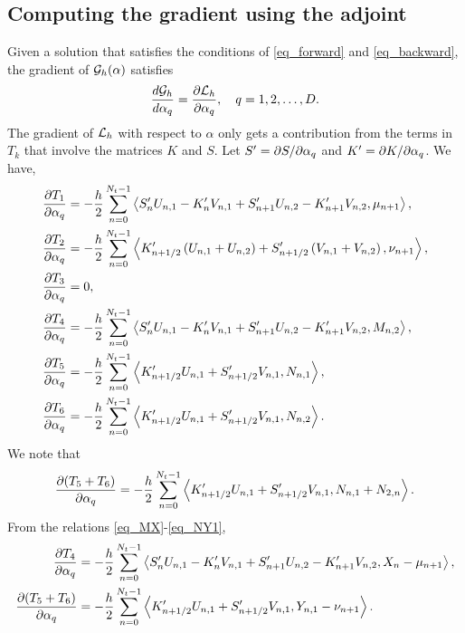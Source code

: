 \documentclass[11pt]{article}
\begin{document}
\subsection{Computing the gradient using the adjoint}

Given a solution that satisfies the conditions of \eqref{eq_forward} and \eqref{eq_backward}, the
gradient of ${\cal G}_h(\alpha)$ satisfies
\[
\frac{d{\cal G}_h}{d\alpha_q} = \frac{\partial{\cal L}_h}{\partial \alpha_q},\quad q=1,2,\ldots,D.
\]
The gradient of ${\cal L}_h$ with respect to $\alpha$ only gets a contribution from the terms in $T_k$ that involve the matrices $K$
and $S$. Let $S' = \partial S/\partial \alpha_q$ and $K' = \partial K/\partial \alpha_q$. We have,
\begin{align}
\frac{\partial T_1}{\partial \alpha_q} &=  - \frac{h}{2} \sum_{n=0}^{N_t-1} \left\langle S'_nU_{n,1} -
K'_nV_{n,1} + S'_{n+1}U_{n,2} - K'_{n+1}V_{n,2}, \mu_{n+1} \right\rangle,\\ 
\frac{\partial T_2}{\partial \alpha_q} &= - \frac{h}{2} \sum_{n=0}^{N_t-1} \left\langle K'_{n+1/2} \left(U_{n,1} + U_{n,2}\right) + S'_{n+1/2}\left(
  V_{n,1} +  V_{n,2}\right), \nu_{n+1} \right\rangle,\\
\frac{\partial T_3}{\partial \alpha_q} &= 0,\\
\frac{\partial T_4}{\partial \alpha_q} &= - \frac{h}{2} \sum_{n=0}^{N_t-1} \left\langle S'_nU_{n,1} - K'_nV_{n,1} + S'_{n+1}U_{n,2} -
  K'_{n+1}V_{n,2} , M_{n,2} \right\rangle,\\
\frac{\partial T_5}{\partial \alpha_q} &= - \frac{h}{2} \sum_{n=0}^{N_t-1} \left\langle   K'_{n+1/2} U_{n,1} + S'_{n+1/2} V_{n,1}, N_{n,1} \right\rangle,\\
\frac{\partial T_6}{\partial \alpha_q} &= - \frac{h}{2} \sum_{n=0}^{N_t-1} \left\langle   K'_{n+1/2} U_{n,1} + S'_{n+1/2} V_{n,1}, N_{n,2} \right\rangle.
\end{align}
We note that
\begin{equation}
  \frac{\partial (T_5+T_6)}{\partial \alpha_q} =
  - \frac{h}{2} \sum_{n=0}^{N_t-1} \left\langle K'_{n+1/2} U_{n,1} + S'_{n+1/2} V_{n,1} , N_{n,1} + N_{2,n} \right\rangle.
\end{equation}
From the relations \eqref{eq_MX}-\eqref{eq_NY1},
\begin{align}
\frac{\p T_4}{\p \alpha_q} &= - \frac{h}{2} \sum_{n=0}^{N_t-1} \left\langle S'_nU_{n,1} - K'_nV_{n,1} + S'_{n+1}U_{n,2} -
K'_{n+1}V_{n,2}, X_{n} - \mu_{n+1} \right\rangle,\\
%
  \frac{\p (T_5 + T_6)}{\p \alpha_q} &=
  - \frac{h}{2} \sum_{n=0}^{N_t-1} \left\langle  K'_{n+1/2} U_{n,1} + S'_{n+1/2} V_{n,1}, Y_{n,1} - \nu_{n+1} \right\rangle.
\end{align}
\end{document}
